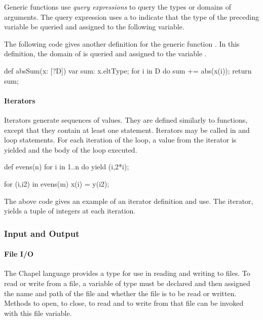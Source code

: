 Generic functions use {\em query expressions} to query the types
or domains of arguments.
The query expression uses a  to indicate that the type of the
preceding variable be queried and assigned to the following variable.

\begin{example}
The following code gives another definition for the generic function
.  In this definition, the domain of  is queried
and assigned to the variable .  
\begin{chapel}
def absSum(x: [?D]) {
  var sum: x.eltType;
  for i in D do sum += abs(x(i));
  return sum;
}
\end{chapel}
\end{example}

\paragraph{Iterators}
Iterators generate sequences of values.
They are defined similarly to functions, except that
they contain at least one  statement.
Iterators may be called in  and  loop
statements.  For each iteration of the loop, a value from the
iterator is yielded and the body of the loop executed.
\begin{example}
\begin{chapel}
def evens(n) {
  for i in 1..n do yield (i,2*i);
}

for (i,i2) in evens(m) {
  x(i) = y(i2);
}
\end{chapel}
The above code gives an example of an iterator definition and use.
The iterator,  yields a tuple of integers at each iteration.
\end{example}

\subsubsection{Input and Output}
\paragraph{File I/O}
The Chapel language provides a  type for use in reading and
writing to files.  To read or write from a file, a variable of 
type must be declared and then assigned the name and path of the file 
and whether the file is to be read or written.  Methods to open, to close,
to read and to write from that file can be invoked with this file
variable.

